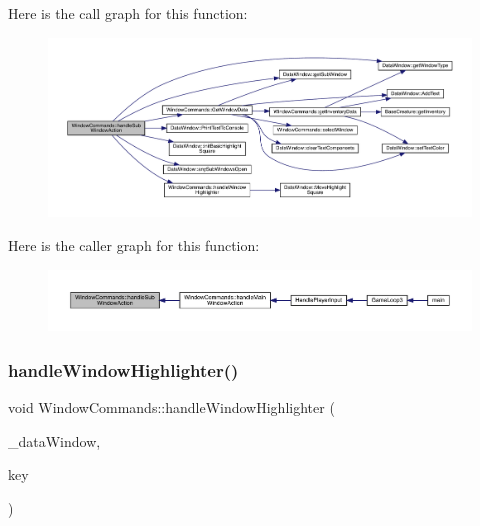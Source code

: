 Here is the call graph for this function\+:
\nopagebreak
\begin{figure}[H]
\begin{center}
\leavevmode
\includegraphics[width=350pt]{class_window_commands_a1c45c8c693e631b581eeb355176a49e7_cgraph}
\end{center}
\end{figure}
Here is the caller graph for this function\+:
\nopagebreak
\begin{figure}[H]
\begin{center}
\leavevmode
\includegraphics[width=350pt]{class_window_commands_a1c45c8c693e631b581eeb355176a49e7_icgraph}
\end{center}
\end{figure}
\mbox{\label{class_window_commands_a579bde80c82ababdcdbf271ccefd30b5}} 
\subsubsection{\texorpdfstring{handle\+Window\+Highlighter()}{handleWindowHighlighter()}}
{\footnotesize\ttfamily void Window\+Commands\+::handle\+Window\+Highlighter (\begin{DoxyParamCaption}\item[{\mbox{\hyperlink{class_data_window}{Data\+Window}} \&}]{\+\_\+data\+Window,  }\item[{sf\+::\+Keyboard\+::\+Key}]{key }\end{DoxyParamCaption})}

